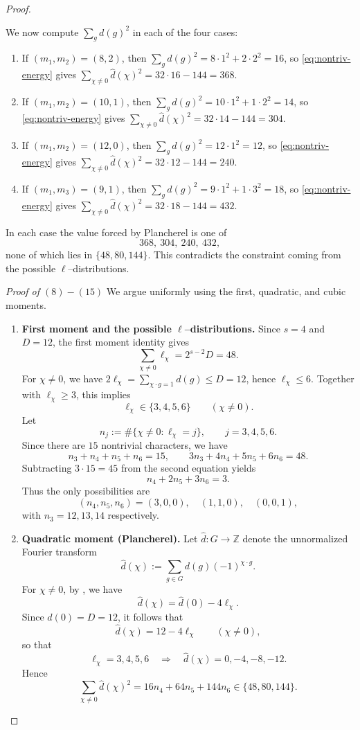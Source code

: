 \documentclass[10pt,a4paper]{amsart}
\begin{document}
\begin{proof}
\begin{enumerate}
We now compute $\sum_g d(g)^2$ in each of the four cases:
\begin{enumerate}
\item If $(m_1,m_2)=(8,2)$, then $\sum_g d(g)^2 = 8\cdot 1^2 + 2\cdot 2^2=16$,
so \eqref{eq:nontriv-energy} gives $\sum_{\chi\neq 0}\widehat d(\chi)^2=32\cdot16-144=368$.
\item If $(m_1,m_2)=(10,1)$, then $\sum_g d(g)^2 = 10\cdot 1^2 + 1\cdot 2^2=14$,
so \eqref{eq:nontriv-energy} gives $\sum_{\chi\neq 0}\widehat d(\chi)^2=32\cdot14-144=304$.
\item If $(m_1,m_2)=(12,0)$, then $\sum_g d(g)^2 = 12\cdot 1^2 = 12$,
so \eqref{eq:nontriv-energy} gives $\sum_{\chi\neq 0}\widehat d(\chi)^2=32\cdot12-144=240$.
\item If $(m_1,m_3)=(9,1)$, then $\sum_g d(g)^2 = 9\cdot 1^2 + 1\cdot 3^2=18$,
so \eqref{eq:nontriv-energy} gives $\sum_{\chi\neq 0}\widehat d(\chi)^2=32\cdot18-144=432$.
\end{enumerate}
In each case the value forced by Plancherel is one of
\[
368,\ 304,\ 240,\ 432,
\]
none of which lies in $\{48,80,144\}$. This contradicts the constraint coming from
the possible $\ell$--distributions.
\end{enumerate}


\noindent\textit{Proof of $(8)-(15)$}
We argue uniformly using the first, quadratic, and cubic moments.

\begin{enumerate}
\item[(i)] \textbf{First moment and the possible $\ell$--distributions.}
Since $s=4$ and $D=12$, the first moment identity gives
\[
\sum_{\chi\neq 0}\ell_\chi = 2^{s-2}D = 48.
\]
For $\chi\neq 0$, we have $2\ell_\chi=\sum_{\chi\cdot g=1} d(g)\le D=12$, hence
$\ell_\chi\le 6$. Together with $\ell_\chi\ge 3$, this implies
\[
\ell_\chi\in\{3,4,5,6\}\qquad(\chi\neq 0).
\]
Let
\[
n_j:=\#\{\chi\neq 0:\ell_\chi=j\},\qquad j=3,4,5,6.
\]
Since there are $15$ nontrivial characters, we have
\[
n_3+n_4+n_5+n_6=15,
\qquad
3n_3+4n_4+5n_5+6n_6=48.
\]
Subtracting $3\cdot 15=45$ from the second equation yields
\[
n_4+2n_5+3n_6=3.
\]
Thus the only possibilities are
\[
(n_4,n_5,n_6)=(3,0,0),\quad (1,1,0),\quad (0,0,1),
\]
with $n_3=12,13,14$ respectively.

\item[(ii)] \textbf{Quadratic moment (Plancherel).}
Let $\widehat d:G\to\mathbb Z$ denote the unnormalized Fourier transform
\[
\widehat d(\chi):=\sum_{g\in G} d(g)(-1)^{\chi\cdot g}.
\]
For $\chi\neq 0$, by , we have 
\[
\widehat d(\chi)=\widehat d(0)-4\ell_\chi.
\]
Since $\widehat d(0)=D=12$, it follows that
\[
\widehat d(\chi)=12-4\ell_\chi\qquad(\chi\neq 0),
\]
so that
\[
\ell_\chi=3,4,5,6
\quad\Longrightarrow\quad
\widehat d(\chi)=0,-4,-8,-12.
\]
Hence
\[
\sum_{\chi\neq 0}\widehat d(\chi)^2
=
16n_4+64n_5+144n_6
\in\{48,80,144\}.
\]


\end{enumerate}
\end{proof}
\end{document}

